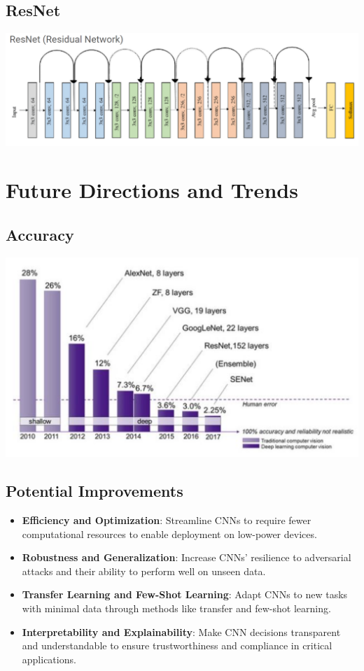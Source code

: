 \documentclass{article}
\begin{document}
    \subsection{ResNet}
        \begin{center}
            \includegraphics[scale=0.35]{images/ResNet.png}
        \end{center}

\section{Future Directions and Trends}
    \subsection{Accuracy}
        \begin{center}
            \includegraphics[scale=0.35]{images/accuracy.png}
        \end{center}

    \subsection{Potential Improvements}
        \begin{itemize}
            \item \textbf{Efficiency and Optimization}: Streamline CNNs to require fewer computational resources to enable deployment on low-power devices.
            \item \textbf{Robustness and Generalization}: Increase CNNs’ resilience to adversarial attacks and their ability to perform well on unseen data.
            \item \textbf{Transfer Learning and Few-Shot Learning}: Adapt CNNs to new tasks with minimal data through methods like transfer and few-shot learning.
            \item \textbf{Interpretability and Explainability}: Make CNN decisions transparent and understandable to ensure trustworthiness and compliance in critical applications.
        \end{itemize}
    
\end{document}
